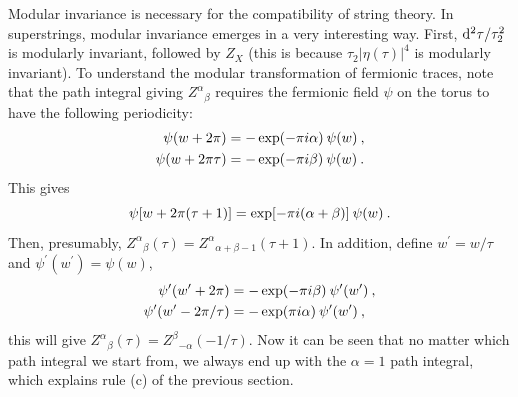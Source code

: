 	Modular invariance is necessary for the compatibility of string theory. In superstrings, modular invariance emerges in a very interesting way. First, $\mathrm{d}^{2}\tau/\tau_{2}^{2}$ is modularly invariant, followed by $Z_{X}$ (this is because $\tau_{2}\lvert\eta(\tau)\rvert^{4}$ is modularly invariant). To understand the modular transformation of fermionic traces, note that the path integral giving $Z^{\alpha}{}_{\beta}$ requires the fermionic field $\psi$ on the torus to have the following periodicity:
	\begin{subequations}
		\begin{align}
			\psi(w+2\pi)&= -\exp(-\pi i\alpha)\: \psi(w) \:, \label{10.7.11a} \\
			\psi(w+2\pi \tau)&= -\exp(-\pi i\beta)\:\psi(w) \:. \label{10.7.11b}
		\end{align} \label{10.7.11}
	\end{subequations}
	This gives
	\begin{equation}
		\psi[w+2\pi(\tau+1)] = \exp [-\pi i(\alpha+\beta)]\:\psi(w) \:. \label{10.7.12}
	\end{equation}
	Then, presumably, $Z^{\alpha}{}_{\beta}(\tau)=Z^{\alpha}{}_{\alpha+\beta-1}(\tau+1)$. In addition, define $w^{\prime}=w/\tau$ and $\psi^{\prime}(w^{\prime})=\psi(w)$,
	\begin{subequations}
		\begin{align}
			\psi^{\prime}(w^{\prime}+2\pi)&= -\exp(-\pi i\beta)\: \psi^{\prime}(w^{\prime}) \:, \label{10.7.13a} \\
			\psi^{\prime}(w^{\prime}-2\pi/\tau)&= -\exp(\pi i\alpha)\:\psi^{\prime}(w^{\prime}) \:, \label{10.7.13b}
		\end{align} \label{10.7.13}
	\end{subequations}
	this will give $Z^{\alpha}{}_{\beta}(\tau) = Z^{\beta}{}_{-\alpha}(-1/\tau)$. Now it can be seen that no matter which path integral we start from, we always end up with the $\alpha=1$ path integral, which explains rule (c) of the previous section.
	
